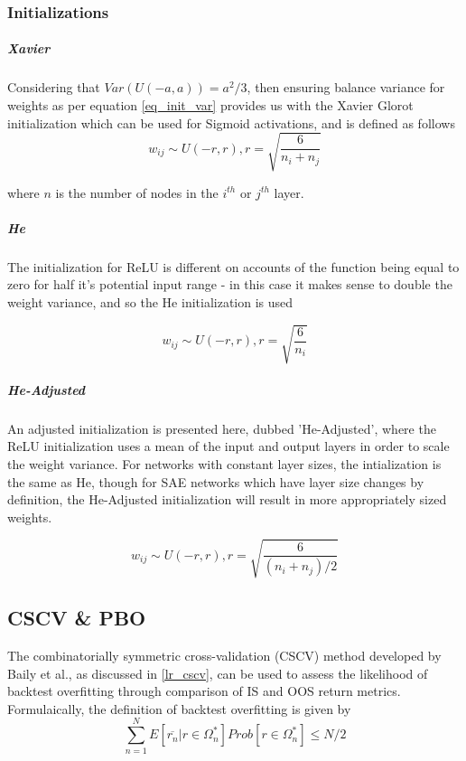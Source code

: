 \documentclass[a4paper,11pt,oneside]{article}
\theoremstyle{plain}
\theoremstyle{definition}
\begin{document}
\subsubsection{Initializations}

\subparagraph{Xavier} Considering that  $Var(U(-a, a)) = a^2/3$, then ensuring balance variance for weights as per equation \eqref{eq_init_var} provides us with the Xavier Glorot initialization \cite{Glorot} which can be used for Sigmoid activations, and is defined as follows
\begin{equation}
w_{ij} \sim U(-r, r), r = \sqrt{\frac{6}{n_i + n_j}}
\end{equation}

where $n$ is the number of nodes in the $i^{th}$ or $j^{th}$ layer.
\newline\newline
\subparagraph{He} The initialization for ReLU is different on accounts of the function being equal to zero for half it's potential input range - in this case it makes sense to double the weight variance, and so the He \cite{He} initialization is used

\begin{equation}
w_{ij} \sim U(-r, r), r = \sqrt{\frac{6}{n_i}}
\end{equation}


\subparagraph{He-Adjusted} An adjusted initialization is presented here, dubbed 'He-Adjusted', where the ReLU initialization uses a mean of the input and output layers in order to scale the weight variance. For networks with constant layer sizes, the intialization is the same as He, though for SAE networks which have layer size changes by definition, the He-Adjusted initialization will result in more appropriately sized weights.

\begin{equation}
w_{ij} \sim U(-r, r), r = \sqrt{\frac{6}{(n_i + n_j)/2}}
\end{equation}














\subsection{CSCV \& PBO}\label{imp_cscv}

The  combinatorially symmetric cross-validation (CSCV) method developed by Baily et al., as discussed in \ref{lr_cscv}, can be used to assess the likelihood of backtest overfitting through comparison of IS and OOS return metrics. Formulaically, the definition of backtest overfitting is given by
\begin{equation}\label{eq:PBO1}
\sum_{n=1}^{N}E[\overline{r_n}|r\in 
\Omega_{n}^{*}]Prob[r\in\Omega_{n}^{*}]\leq{N/2}
\end{equation}
\end{document}
